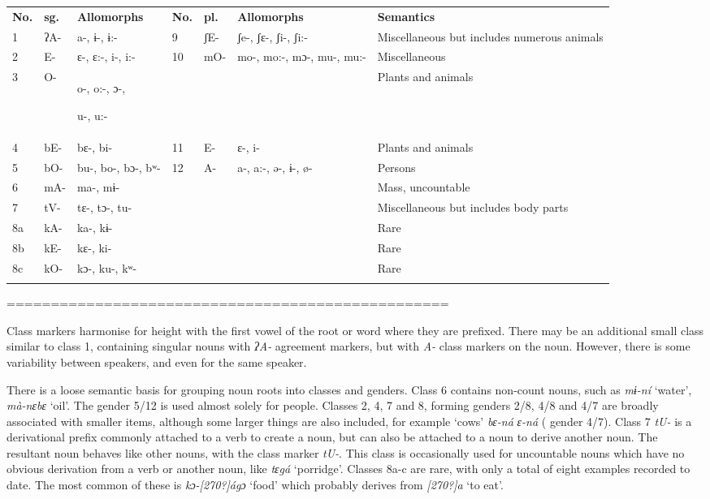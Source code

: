 \documentclass[output=paper]{langsci/langscibook}
\begin{document}
\begin{tabularx}{\textwidth}{XXXXXXX}
\lsptoprule
 \textbf{No.} & \textbf{sg.} & \textbf{Allomorphs} & \textbf{No.} & \textbf{pl.} & \textbf{Allomorphs} & \textbf{Semantics}\\
 1 & ʔA- & a-, ɨ-, ɨ:- & 9 &  ʃE- & ʃe-, ʃɛ-, ʃi-, ʃi:- & Miscellaneous but includes numerous animals\\
 2 & E- & ɛ{}-, ɛ:-, i-, i:- & 10 &  mO- & mo-, mo:-, mɔ-, mu-, mu:- & Miscellaneous\\
 3 & O- & o-, o:-, ɔ-, 

u-, u:- &  &  &  & Plants and animals\\
 4 & bE- & bɛ-, bi- & 11 &  E- & ɛ{}-, i- & Plants and animals\\
 5 & bO- & bu-, bo-, bɔ-, bʷ- & 12 &  A- & a-, a:-, ə-, ɨ-, ø- & Persons\\
 6 & mA- & ma-, mɨ- &  &  &  & Mass, uncountable\\
 7 & tV- & tɛ-, tɔ-, tu- &  &  &  & Miscellaneous but includes body parts\\
 8a & kA- & ka-, kɨ- &  &  &  & Rare\\
 8b & kE- & kɛ-, ki- &  &  &  & Rare\\
 8c & kO- & kɔ-, ku-, kʷ- &  &  &  & Rare\\
\lspbottomrule
\end{tabularx}
{==================================================}

{Class markers harmonise for height with the first vowel of the root or word where they are prefixed. There may be an additional small class similar to class 1, containing singular nouns with} {\textit{ʔ}}\textit{A-} agreement markers, but with \textit{A-} class markers on the noun. However, there is some variability between speakers, and even for the same speaker.{} 

{There is a loose semantic basis for grouping noun roots into classes and genders. Class 6 contains non-count} nouns, such as \textit{mɨ-ní} ‘water’, \textit{mà-nɛbɛ} ‘oil’. {The gender 5/12 is used almost solely for people. Classes 2, 4, 7 and 8, forming} genders 2/8, 4/8 and 4/7 are broadly associated with smaller items, although some larger things are also included, for example ‘cows’ \textit{bɛ-ná}  \textit{ɛ{}-ná} ( gender 4/7). {Class 7} {\textit{tU-}}{ is a derivational prefix commonly attached to a verb to create a noun, but can also be attached to a noun to derive another noun. The resultant noun behaves like othe}r nouns, with the class marker \textit{tU-}. This class is occasionally used for uncountable nouns which have no obvious derivation from a verb or another noun, like \textit{tɛgá} ‘porridge’.{} {Classes 8a-c are rare, with only a total of eight examples recorded to date. The most common of these is} {\textit{k}}\textit{ɔ{}-[270?]ágɔ} ‘food’ {which probably derives from} \textit{[270?]a} ‘to eat’.
\end{document}
